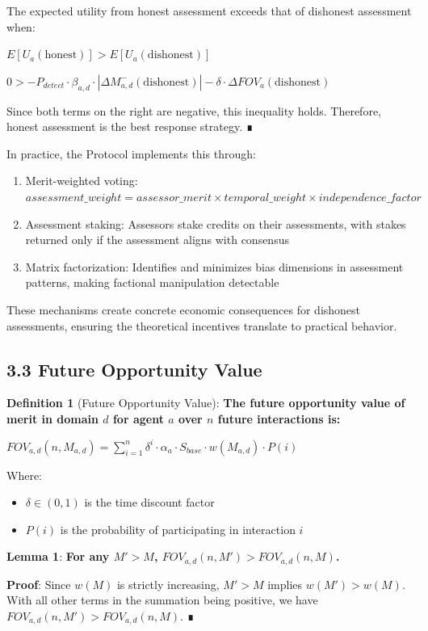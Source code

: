 \documentclass[11pt]{article}
\begin{document}
The expected utility from honest assessment exceeds that of dishonest assessment when:

\(E[U_a(\text{honest})] > E[U_a(\text{dishonest})]\)

\(0 > -P_{detect} \cdot \beta_{a,d} \cdot |\Delta M_{a,d}^-(\text{dishonest})| - \delta \cdot \Delta FOV_a(\text{dishonest})\)

Since both terms on the right are negative, this inequality holds. Therefore, honest assessment is the best response strategy. ∎

In practice, the Protocol implements this through:

\begin{enumerate}
\item Merit-weighted voting:
\(assessment\_weight = assessor\_merit \times temporal\_weight \times independence\_factor\)
\item Assessment staking:
Assessors stake credits on their assessments, with stakes returned only if the assessment aligns with consensus
\item Matrix factorization:
Identifies and minimizes bias dimensions in assessment patterns, making factional manipulation detectable
\end{enumerate}

These mechanisms create concrete economic consequences for dishonest assessments, ensuring the theoretical incentives translate to practical behavior.
\subsection{3.3 Future Opportunity Value}
\label{sec:org370731a}
\textbf{Definition 1} (Future Opportunity Value): \textbf{The future opportunity value of merit in domain \(d\) for agent \(a\) over \(n\) future interactions is:}

\(FOV_{a,d}(n, M_{a,d}) = \sum_{i=1}^{n} \delta^i \cdot \alpha_a \cdot S_{base} \cdot w(M_{a,d}) \cdot P(i)\)

Where:
\begin{itemize}
\item \(\delta \in (0,1)\) is the time discount factor
\item \(P(i)\) is the probability of participating in interaction \(i\)
\end{itemize}

\textbf{Lemma 1}: \textbf{For any \(M' > M\), \(FOV_{a,d}(n, M') > FOV_{a,d}(n, M)\).}

\textbf{Proof}: Since \(w(M)\) is strictly increasing, \(M' > M\) implies \(w(M') > w(M)\). With all other terms in the summation being positive, we have \(FOV_{a,d}(n, M') > FOV_{a,d}(n, M)\). ∎
\end{document}
